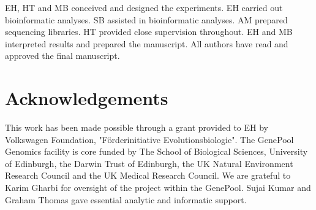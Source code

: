 \documentclass[10pt]{bmc_article}
\newenvironment{bmcformat}{\begin{raggedright}\baselineskip20pt\sloppy\setboolean{publ}{false}}{\end{raggedright}\baselineskip20pt\sloppy}
\begin{document}
\begin{bmcformat}
EH, HT and MB conceived and designed the experiments. EH carried out
bioinformatic analyses. SB assisted in bioinformatic analyses. AM
prepared sequencing libraries. HT provided close supervision
throughout. EH and MB interpreted results and prepared the
manuscript. All authors have read and approved the final manuscript.

\section*{Acknowledgements}

This work has been made possible through a grant provided to EH by
Volkswagen Foundation, "F\"{o}rderinitiative Evolutionsbiologie". The
GenePool Genomics facility is core funded by The School of Biological
Sciences, University of Edinburgh, the Darwin Trust of Edinburgh, the
UK Natural Environment Research Council and the UK Medical Research
Council. We are grateful to Karim Gharbi for oversight of the project
within the GenePool. Sujai Kumar and Graham Thomas gave essential
analytic and informatic support.


{
  
} %


\newpage


\end{bmcformat}
\end{document}
